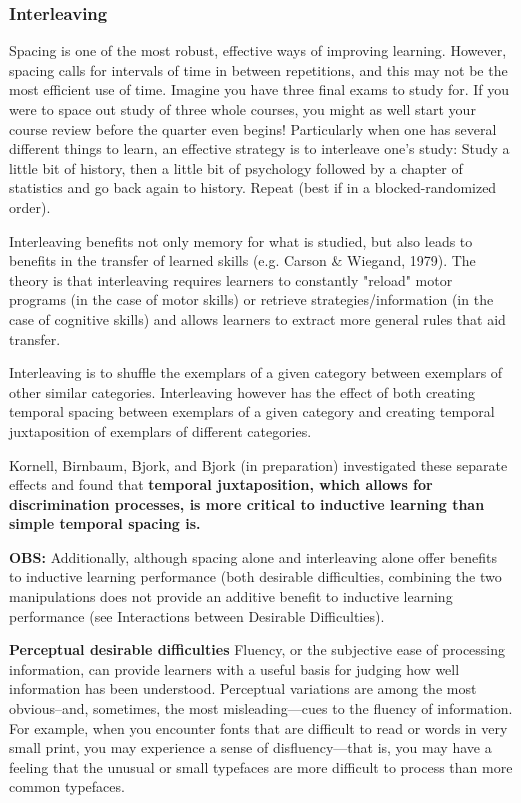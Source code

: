 \subsubsection{Interleaving}
Spacing is one of the most robust, effective ways of improving learning. However, spacing calls for intervals of time in between repetitions, and this may not be the most efficient use of time. Imagine you have three final exams to study for. If you were to space out study of three whole courses, you might as well start your course review before the quarter even begins! Particularly when one has several different things to learn, an effective strategy is to interleave one's study: Study a little bit of history, then a little bit of psychology followed by a chapter of statistics and go back again to history. Repeat (best if in a blocked-randomized order).

Interleaving benefits not only memory for what is studied, but also leads to benefits in the transfer of learned skills (e.g. Carson \& Wiegand, 1979). The theory is that interleaving requires learners to constantly "reload" motor programs (in the case of motor skills) or retrieve strategies/information (in the case of cognitive skills) and allows learners to extract more general rules that aid transfer.

Interleaving is to shuffle the exemplars of a given category between exemplars of other similar categories. Interleaving however has the effect of both creating temporal spacing between exemplars of a given category and creating temporal juxtaposition of exemplars of different categories.

Kornell, Birnbaum, Bjork, and Bjork (in preparation) investigated these separate effects and found that \textbf{temporal juxtaposition, which allows for discrimination processes, is more critical to inductive learning than simple temporal spacing is.}

\textbf{OBS:} Additionally, although spacing alone and interleaving alone offer benefits to inductive learning performance (both desirable difficulties, combining the two manipulations does not provide an additive benefit to inductive learning performance (see Interactions between Desirable Difficulties).

\textbf{Perceptual desirable difficulties}
Fluency, or the subjective ease of processing information, can provide learners with a useful basis for judging how well information has been understood. Perceptual variations are among the most obvious--and, sometimes, the most misleading—cues to the fluency of information. For example, when you encounter fonts that are difficult to read or words in very small print, you may experience a sense of disfluency—that is, you may have a feeling that the unusual or small typefaces are more difficult to process than more common typefaces.

